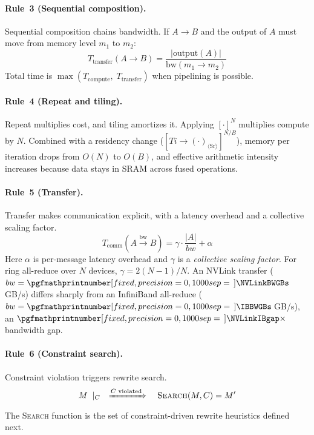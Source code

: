 \documentclass[10pt,twocolumn]{article}
\newcommand{\cvalint}[1]{\pgfmathprintnumber[fixed, precision=0, 1000 sep={\,}]{#1}}
\begin{document}
\paragraph{Rule~3 (Sequential composition).} Sequential composition chains bandwidth. If $A \rightarrow B$ and the output of $A$ must move from memory level $m_1$ to $m_2$:
\begin{equation}
\label{eq:seq-bw}
T_{\text{transfer}}(A \rightarrow B) = \frac{|\text{output}(A)|}{\text{bw}(m_1 \to m_2)}
\end{equation}
Total time is $\max(T_{\text{compute}},\; T_{\text{transfer}})$ when pipelining is possible.

\paragraph{Rule~4 (Repeat and tiling).} Repeat multiplies cost, and tiling amortizes it. Applying $[\cdot]^N$ multiplies compute by $N$. Combined with a residency change ($[Ti \rightarrow (\cdot)_{\langle \text{Sr} \rangle}]^{N/B}$), memory per iteration drops from $O(N)$ to $O(B)$, and effective arithmetic intensity increases because data stays in SRAM across fused operations.

\paragraph{Rule~5 (Transfer).} Transfer makes communication explicit, with a latency overhead and a collective scaling factor.
\begin{equation}
\label{eq:transfer}
T_{\text{comm}}(A \xrightarrow{\text{bw}} B) = \gamma \cdot \frac{|A|}{bw} + \alpha
\end{equation}
Here $\alpha$ is per-message latency overhead and $\gamma$ is a \emph{collective scaling factor}. For ring all-reduce over $N$ devices, $\gamma = 2(N{-}1)/N$. An NVLink transfer ($bw = \cvalint{\NVLinkBWGBs}$\,GB/s) differs sharply from an InfiniBand all-reduce ($bw = \cvalint{\IBBWGBs}$\,GB/s), an $\cvalint{\NVLinkIBgap}\times$ bandwidth gap.

\paragraph{Rule~6 (Constraint search).} Constraint violation triggers rewrite search.
\begin{equation}
\label{eq:constraint}
M \;\mid_{C} \quad \xRightarrow{C \text{ violated}} \quad \text{\textsc{Search}}(M, C) = M'
\end{equation}
The \textsc{Search} function is the set of constraint-driven rewrite heuristics defined next.
\end{document}

